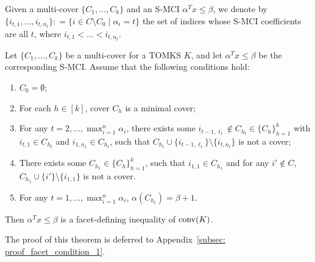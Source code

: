 Given a multi-cover $\{C_1,\dots,C_k\}$ and an S-MCI $\alpha^T x \leq \beta$, we denote by $\{i_{t,1}, \ldots, i_{t, n_t}\}: = \{i \in C \setminus C_0  \mid \alpha_i = t\}$ the set of indices whose S-MCI coefficients are all $t$, where $i_{t, 1} < \ldots < i_{t, n_t}$. 
 
 

\begin{theorem}
\label{theo: facet_condition_1}
Let $\{C_1,\dots,C_k\}$ be a multi-cover for a TOMKS $K$, and let $\alpha^T x \leq \beta$ be the corresponding S-MCI. 
Assume that the following conditions hold:
\begin{enumerate}
\item $C_0 = \emptyset$; \label{cond: 1}
\item For each $h \in [k]$, cover $C_h$ is a minimal cover; \label{cond: 2}
\item For any $t = 2, \ldots, \max_{i=1}^n \alpha_i$, there exists some $ i_{t-1, \ell_t} \notin C_{h_t} \in  \{C_h\}_{h=1}^k$ with
$i_{t,1} \in C_{h_t}$ and $i_{1,n_1} \in C_{h_t}$, such that
$C_{h_t} \cup \{i_{t-1, \ell_t}\} \setminus \{i_{t, n_t}\}$ is not a cover; \label{cond: 3}
\item There exists some $C_{h_1} \in \{C_h\}_{h=1}^k$, such that $i_{1, 1} \in C_{h_1}$ and for any $i' \notin C$, $C_{h_1} \cup \{i'\} \setminus \{i_{1, 1}\}$ is not a cover. \label{cond: 4}
\item For any $t = 1, \ldots, \max_{i=1}^n \alpha_i$, $\alpha(C_{h_t}) = \beta + 1$. \label{cond: 5}
\end{enumerate}
Then $\alpha^T x \leq \beta$ is a facet-defining inequality of $\operatorname{conv}(K)$.
\end{theorem}

The proof of this theorem is deferred to Appendix~\ref{subsec: proof_facet_condition_1}. 




